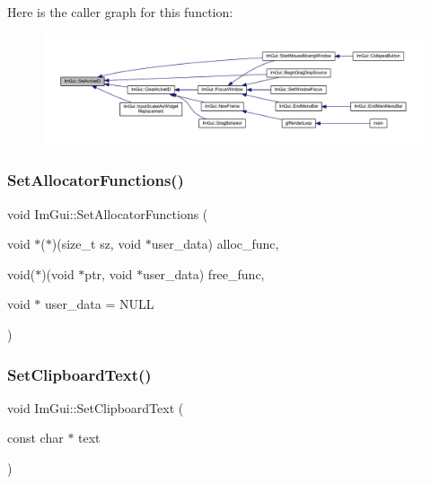 Here is the caller graph for this function\+:
\nopagebreak
\begin{figure}[H]
\begin{center}
\leavevmode
\includegraphics[width=350pt]{namespace_im_gui_a27b8ace13a8c421ee8405f0cbebe4ead_icgraph}
\end{center}
\end{figure}
\mbox{\label{namespace_im_gui_aa06dc28aca85fb0f38edd2c9e639f03f}} 
\subsubsection{\texorpdfstring{Set\+Allocator\+Functions()}{SetAllocatorFunctions()}}
{\footnotesize\ttfamily void Im\+Gui\+::\+Set\+Allocator\+Functions (\begin{DoxyParamCaption}\item[{void $\ast$($\ast$)(size\+\_\+t sz, void $\ast$user\+\_\+data)}]{alloc\+\_\+func,  }\item[{void($\ast$)(void $\ast$ptr, void $\ast$user\+\_\+data)}]{free\+\_\+func,  }\item[{void $\ast$}]{user\+\_\+data = {\ttfamily NULL} }\end{DoxyParamCaption})}

\mbox{\label{namespace_im_gui_aa4824a1b351c063b4aff9b9f4fb5fd4d}} 
\subsubsection{\texorpdfstring{Set\+Clipboard\+Text()}{SetClipboardText()}}
{\footnotesize\ttfamily void Im\+Gui\+::\+Set\+Clipboard\+Text (\begin{DoxyParamCaption}\item[{const char $\ast$}]{text }\end{DoxyParamCaption})}

